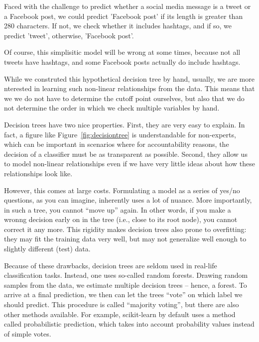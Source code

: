 Faced with the challenge to predict whether a social media message is a tweet
or a Facebook post, we could predict 'Facebook post' if its length is greater than 280 characters. If not, we check whether it includes hashtags, and if so, we predict 'tweet', otherwise, 'Facebook post'.

Of course, this simplisitic model will be wrong at some times, because not all tweets have hashtags, and some Facebook posts actually do include hashtags.

While we construted this hypothetical decision tree by hand, usually, we are more nterested in learning such non-linear relationships from the data.
This means that we we do not have to determine the cutoff point ourselves, but also that we do not determine the order in which we check multiple variables by hand.


Decision trees have two nice properties. First, they are very easy to explain.
In fact, a figure like Figure~\ref{fig:decisiontree} is understandable for non-experts, which can be important in scenarios where for accountability reasons, the decision of a classifier must be as transparent as possible.
Second, they allow us to model non-linear relationships even if we have very little ideas about how these relationships look like.

However, this comes at large costs.
Formulating a model as a series of yes/no questions, as you can imagine, inherently uses a lot of nuance. More importantly, in such a tree, you cannot ``move up'' again. In other words, if you make a wronng decision early on in the tree (i.e., close to its root node), you cannot correct it any more.
This rigidity makes decision trees also prone to overfitting: they may fit the training data very well, but may not generalize well enough to slightly different (test) data.

Because of these drawbacks, decision trees are seldom used in real-life classification tasks.
Instead, one uses so-called random forests.
Drawing random samples from the data, we estimate multiple decision trees -- hence, a forest.
To arrive at a final prediction, we then can let the trees ``vote'' on which label we should predict. This procedure is called ``majority voting'', but there are also other methods available. For example, scikit-learn by default uses a method called probabilistic prediction, which takes into account probability values instead of simple votes.


